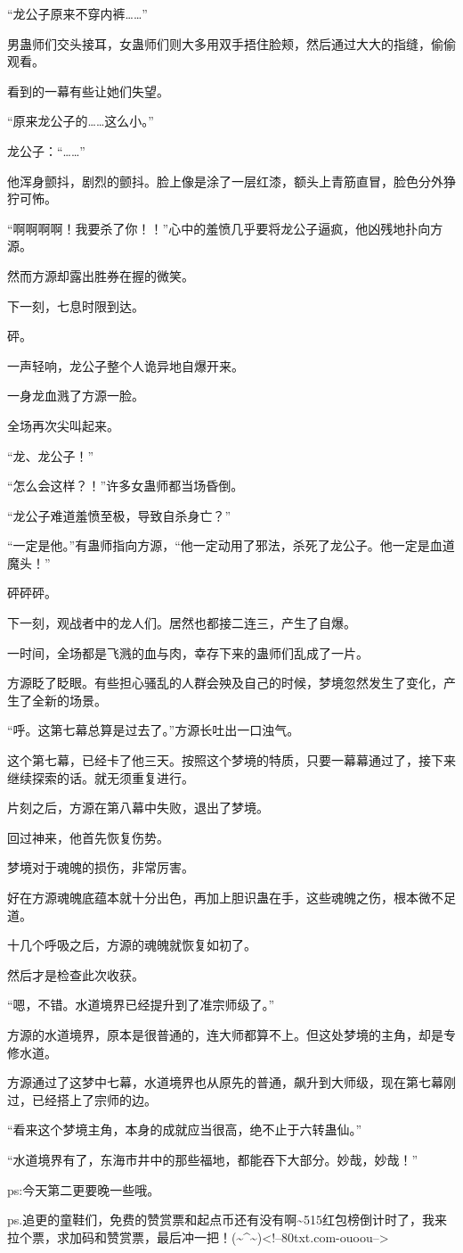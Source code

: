 \begin{this_body}
“龙公子原来不穿内裤……”

男蛊师们交头接耳，女蛊师们则大多用双手捂住脸颊，然后通过大大的指缝，偷偷观看。

看到的一幕有些让她们失望。

“原来龙公子的……这么小。”

龙公子：“……”

他浑身颤抖，剧烈的颤抖。脸上像是涂了一层红漆，额头上青筋直冒，脸色分外狰狞可怖。

“啊啊啊啊！我要杀了你！！”心中的羞愤几乎要将龙公子逼疯，他凶残地扑向方源。

然而方源却露出胜券在握的微笑。

下一刻，七息时限到达。

砰。

一声轻响，龙公子整个人诡异地自爆开来。

一身龙血溅了方源一脸。

全场再次尖叫起来。

“龙、龙公子！”

“怎么会这样？！”许多女蛊师都当场昏倒。

“龙公子难道羞愤至极，导致自杀身亡？”

“一定是他。”有蛊师指向方源，“他一定动用了邪法，杀死了龙公子。他一定是血道魔头！”

砰砰砰。

下一刻，观战者中的龙人们。居然也都接二连三，产生了自爆。

一时间，全场都是飞溅的血与肉，幸存下来的蛊师们乱成了一片。

方源眨了眨眼。有些担心骚乱的人群会殃及自己的时候，梦境忽然发生了变化，产生了全新的场景。

“呼。这第七幕总算是过去了。”方源长吐出一口浊气。

这个第七幕，已经卡了他三天。按照这个梦境的特质，只要一幕幕通过了，接下来继续探索的话。就无须重复进行。

片刻之后，方源在第八幕中失败，退出了梦境。

回过神来，他首先恢复伤势。

梦境对于魂魄的损伤，非常厉害。

好在方源魂魄底蕴本就十分出色，再加上胆识蛊在手，这些魂魄之伤，根本微不足道。

十几个呼吸之后，方源的魂魄就恢复如初了。

然后才是检查此次收获。

“嗯，不错。水道境界已经提升到了准宗师级了。”

方源的水道境界，原本是很普通的，连大师都算不上。但这处梦境的主角，却是专修水道。

方源通过了这梦中七幕，水道境界也从原先的普通，飙升到大师级，现在第七幕刚过，已经搭上了宗师的边。

“看来这个梦境主角，本身的成就应当很高，绝不止于六转蛊仙。”

“水道境界有了，东海市井中的那些福地，都能吞下大部分。妙哉，妙哉！”

ps:今天第二更要晚一些哦。

ps.追更的童鞋们，免费的赞赏票和起点币还有没有啊\~{}515红包榜倒计时了，我来拉个票，求加码和赞赏票，最后冲一把！(\~{}\^{}\~{})<!--80txt.com-ouoou-->

\end{this_body}

